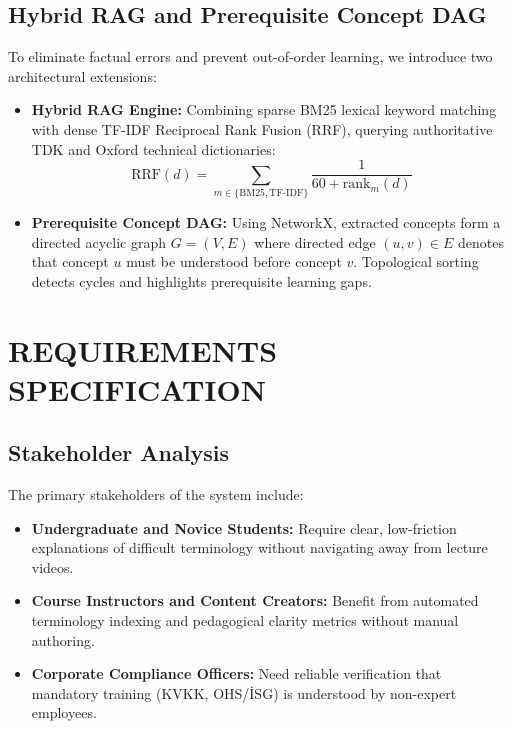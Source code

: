 \documentclass[a4paper,12pt]{report}
\begin{document}
\section{Hybrid RAG and Prerequisite Concept DAG}
To eliminate factual errors and prevent out-of-order learning, we introduce two architectural extensions:
\begin{itemize}
    \item \textbf{Hybrid RAG Engine:} Combining sparse BM25 lexical keyword matching with dense TF-IDF Reciprocal Rank Fusion (RRF), querying authoritative TDK and Oxford technical dictionaries:
    \begin{equation}
    \text{RRF}(d) = \sum_{m \in \{\text{BM25}, \text{TF-IDF}\}} \frac{1}{60 + \text{rank}_m(d)}
    \end{equation}
    \item \textbf{Prerequisite Concept DAG:} Using NetworkX, extracted concepts form a directed acyclic graph $G=(V,E)$ where directed edge $(u,v) \in E$ denotes that concept $u$ must be understood before concept $v$. Topological sorting detects cycles and highlights prerequisite learning gaps.
\end{itemize}


\chapter{REQUIREMENTS SPECIFICATION}

\section{Stakeholder Analysis}
The primary stakeholders of the system include:
\begin{itemize}
    \item \textbf{Undergraduate and Novice Students:} Require clear, low-friction explanations of difficult terminology without navigating away from lecture videos.
    \item \textbf{Course Instructors and Content Creators:} Benefit from automated terminology indexing and pedagogical clarity metrics without manual authoring.
    \item \textbf{Corporate Compliance Officers:} Need reliable verification that mandatory training (KVKK, OHS/İSG) is understood by non-expert employees.
\end{itemize}
\end{document}

